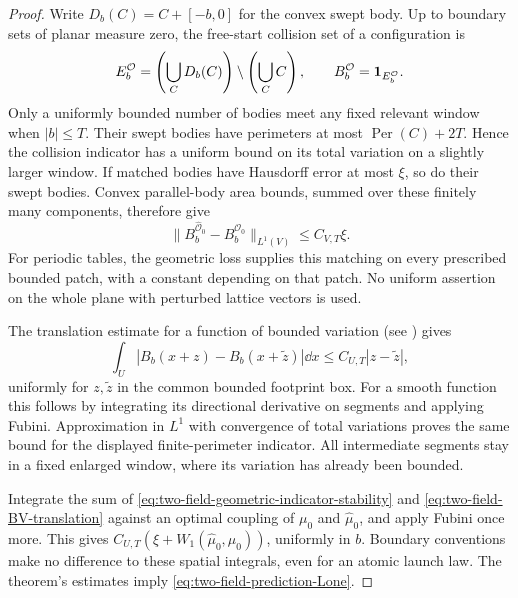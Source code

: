 \begin{proof}
Write $D_b(C)=C+[-b,0]$ for the convex swept body.  Up to boundary
sets of planar measure zero, the free-start collision set of a
configuration is
\[
 E_b^{\mathcal O}
   =\left(\bigcup_C D_b(C)\right)\setminus\left(\bigcup_C C\right),
                         \qquad B_b^{\mathcal O}=\mathbf 1_{E_b^{\mathcal O}}.
\]
Only a uniformly bounded number of bodies meet any fixed relevant
window when $|b|\le T$.  Their swept bodies have perimeters at most
$\operatorname{Per}(C)+2T$.  Hence the collision indicator has a
uniform bound on its total variation on a slightly larger window.
If matched bodies have Hausdorff error at most $\xi$, so do their
swept bodies.  Convex parallel-body area bounds, summed over these
finitely many components, therefore give
\begin{equation}\label{eq:two-field-geometric-indicator-stability}
 \|B_b^{\widehat{\mathcal O}_0}-B_b^{\mathcal O_0}\|_{L^1(V)}
                               \le C_{V,T}\xi.
\end{equation}
For periodic tables, the geometric loss supplies this matching on
every prescribed bounded patch, with a constant depending on that
patch.  No uniform assertion on the whole plane with perturbed
lattice vectors is used.

The translation estimate for a function of bounded variation
(see \cite[Chapter~3]{AFP}) gives
\begin{equation}\label{eq:two-field-BV-translation}
 \int_U |B_b(x+z)-B_b(x+\widetilde z)|\dd x
                              \le C_{U,T}|z-\widetilde z|,
\end{equation}
uniformly for $z,\widetilde z$ in the common bounded footprint box.
For a smooth function this follows by integrating its directional
derivative on segments and applying Fubini.  Approximation in
$L^1$ with convergence of total variations proves the same bound
for the displayed finite-perimeter indicator.  All intermediate
segments stay in a fixed enlarged window, where its variation has
already been bounded.

Integrate the sum of
\eqref{eq:two-field-geometric-indicator-stability} and
\eqref{eq:two-field-BV-translation} against an optimal coupling of
$\mu_0$ and $\widehat\mu_0$, and apply Fubini once more.  This gives
$C_{U,T}(\xi+W_1(\widehat\mu_0,\mu_0))$, uniformly in $b$.
Boundary conventions make no difference to these spatial integrals,
even for an atomic launch law.  The theorem's estimates imply
\eqref{eq:two-field-prediction-Lone}.
\end{proof}


